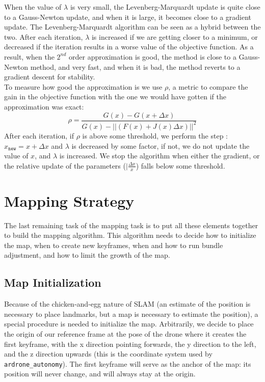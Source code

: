 When the value of $\lambda$ is very small, the Levenberg-Marquardt update is quite close to a Gauss-Newton update, and when it is large, it becomes close to a gradient update. The Levenberg-Marquardt algorithm can be seen as a hybrid between the two. After each iteration, $\lambda$ is increased if we are getting closer to a minimum, or decreased if the iteration results in a worse value of the objective function. As a result, when the $2^{nd}$ order approximation is good, the method is close to a Gauss-Newton method, and very fast, and when it is bad, the method reverts to a gradient descent for stability.\\

To measure how good the approximation is we use $\rho$, a metric to compare the gain in the objective function with the one we would have gotten if the approximation was exact:
\begin{equation}\label{eq:metric}
	\rho = \frac{G(x) - G(x + \Delta x)}{G(x) - ||(F(x) + J(x)\Delta x)||^2}
\end{equation}
After each iteration, if $\rho$ is above some threshold, we perform the step : $x_{\texttt{new}} =x + \Delta x$ and $\lambda$ is decreased by some factor, if not, we do not update the value of $x$, and $\lambda$ is increased. We stop the algorithm when either the gradient, or the relative update of the parameters ($|\frac{\Delta x}{x}$) falls below some threshold. \cite{levmar}


\section{Mapping Strategy}\label{sec:mapstrat}
The last remaining task of the mapping task is to put all these elements together to build the mapping algorithm. This algorithm needs to decide how to initialize the map, when to create new keyframes, when and how to run bundle adjustment, and how to limit the growth of the map.

\subsection{Map Initialization}
Because of the chicken-and-egg nature of SLAM (an estimate of the position is necessary to place landmarks, but a map is necessary to estimate the position), a special procedure is needed to initialize the map. Arbitrarily, we decide to place the origin of our reference frame at the pose of the drone where it creates the first keyframe, with the x direction pointing forwards, the y direction to the left, and the z direction upwards (this is the coordinate system used by \texttt{ardrone\_autonomy}). The first keyframe will serve as the anchor of the map: its position will never change, and will always stay at the origin.\\

